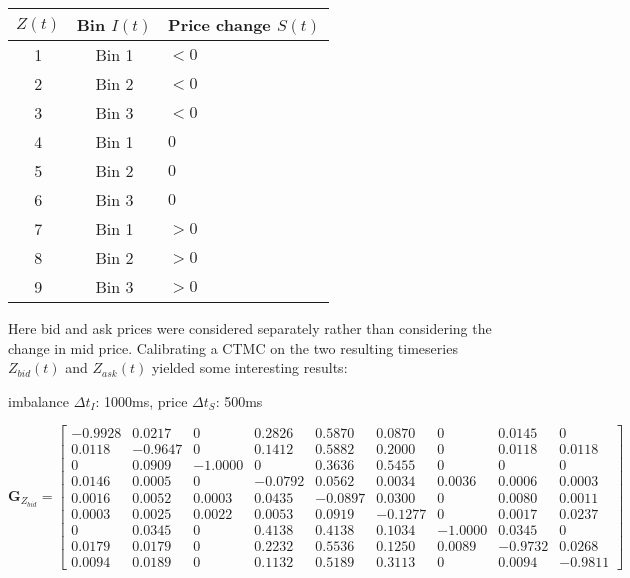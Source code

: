 \documentclass[12pt]{article}
\newcommand\mat[1]{\boldsymbol{#1}}
\begin{document}
\begin{table}[H]
\small
\centering
\vspace*{2.5mm}
\begin{tabularx} {0.4\textwidth}{c|c|X}
\hline
$Z(t)$ & Bin $I(t)$ & Price change $S(t)$ \\
\hline\hline
1 & Bin 1 & $<0$ \\
\hline
2 & Bin 2 & $<0$ \\
\hline
3 & Bin 3 & $<0$ \\
\hline
4 & Bin 1 & $0$ \\
\hline
5 & Bin 2 & $0$ \\
\hline
6 & Bin 3 & $0$ \\
\hline
7 & Bin 1 & $>0$ \\
\hline
8 & Bin 2 & $>0$ \\
\hline
9 & Bin 3 & $>0$ \\
\hline
\end{tabularx}
\end{table}

Here bid and ask prices were considered separately rather than considering the change in mid price. Calibrating a CTMC on the two resulting timeseries $Z_{bid}(t)$ and $Z_{ask}(t)$ yielded some interesting results:


imbalance $\Delta t_I$: 1000ms, price $\Delta t_S$: 500ms

$$\mat{G}_{Z_{bid}} =
\begin{bmatrix}
-0.9928 &   0.0217   &      0 &   0.2826  &  0.5870  &  0.0870  &       0   & 0.0145     &    0 \\

    0.0118  & -0.9647   &     0  &  0.1412 &   0.5882 &   0.2000   &      0   & 0.0118  &  0.0118 \\
         0  &  0.0909  & -1.0000   &      0  &  0.3636  &  0.5455  &       0     & 0  &       0 \\
    0.0146  &  0.0005     &    0  & -0.0792  &  0.0562   & 0.0034 &   0.0036   & 0.0006  &  0.0003 \\
    0.0016 &   0.0052   & 0.0003 &   0.0435  & -0.0897 &   0.0300  &       0   & 0.0080 &   0.0011 \\
    0.0003&    0.0025 &   0.0022  &  0.0053   & 0.0919  & -0.1277     &    0   & 0.0017 &   0.0237 \\
         0  &  0.0345   &      0  &  0.4138  &  0.4138  &  0.1034 &  -1.0000   & 0.0345    &     0 \\
    0.0179   & 0.0179    &     0   & 0.2232   & 0.5536  &  0.1250 &   0.0089  & -0.9732 &   0.0268 \\
    0.0094&    0.0189   &      0  &  0.1132&    0.5189 &  0.3113    &     0   & 0.0094 &  -0.9811
\end{bmatrix}$$
\end{document}
